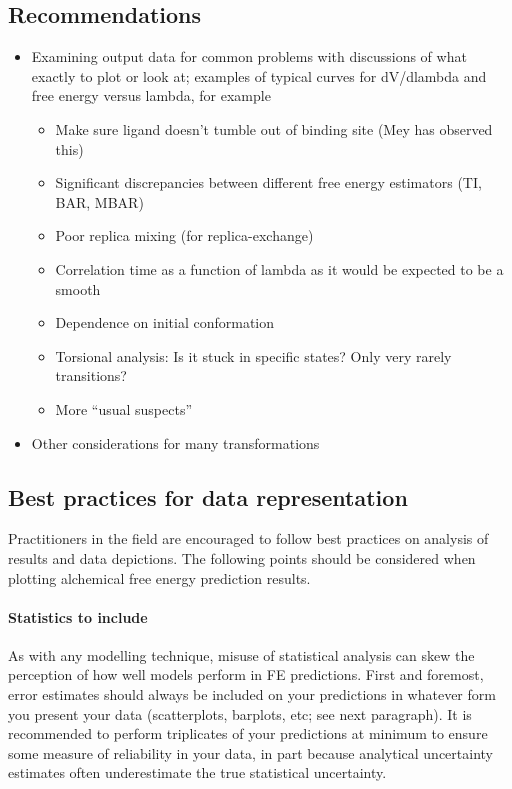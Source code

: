 \documentclass[9pt,bestpractices]{livecoms}
\begin{document}
\subsection{Recommendations}
\begin{itemize}
\item Examining output data for common problems with discussions of what exactly to plot or look at; examples of typical curves for dV/dlambda and free energy versus lambda, for example
\begin{itemize}
\item Make sure ligand doesn’t tumble out of binding site (Mey has observed this)
\item Significant discrepancies between different free energy estimators (TI, BAR, MBAR)
\item Poor replica mixing (for replica-exchange)
\item Correlation time as a function of lambda as it would be expected to be a smooth
\item Dependence on initial conformation
\item Torsional analysis: Is it stuck in specific states? Only very rarely transitions?
\item More “usual suspects”
\end{itemize}
\item Other considerations for many transformations
\end{itemize}

\subsection{Best practices for data representation}


Practitioners in the field are encouraged to follow best practices on analysis of results and data depictions. The following points should be considered when plotting alchemical free energy prediction results.
\paragraph{Statistics to include}
As with any modelling technique, misuse of statistical analysis can skew the perception of how well models perform in FE predictions. First and foremost, error estimates should always be included on your predictions in whatever form you present your data (scatterplots, barplots, etc; see next paragraph). It is recommended to perform triplicates of your predictions at minimum to ensure some measure of reliability in your data, in part because analytical uncertainty estimates often underestimate the true statistical uncertainty.
\end{document}
